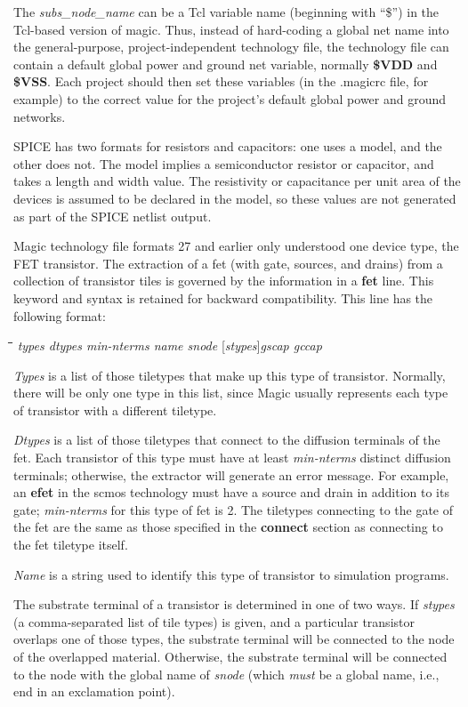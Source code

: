 \documentclass[letterpaper,twoside,12pt]{article}
\def\hinch{\hspace*{0.5in}}
\def\starti{\begin{center}\begin{tabbing}\hinch\=\hinch\=\hinch\=\hinch\=\kill}
\def\endi{\end{tabbing}\end{center}}
\def\ii{\>\>\>}
\begin{document}
The {\itshape subs\_node\_name} can be a Tcl variable name (beginning with ``\$'')
in the Tcl-based version of magic.  Thus, instead of hard-coding a global net
name into the general-purpose, project-independent technology file, the
technology file can contain a default global power and ground net variable,
normally {\bfseries \$VDD} and {\bfseries \$VSS}.  Each project should then
set these variables (in the {\ttfamily .magicrc} file, for example) to the
correct value for the project's default global power and ground networks.

SPICE has two formats for resistors and capacitors:  one uses a model, and
the other does not.  The model implies a semiconductor resistor or
capacitor, and takes a length and width value.  The resistivity or
capacitance per unit area of the devices is assumed to be declared in
the model, so these values are not generated as part of the SPICE
netlist output.

Magic technology file formats 27 and earlier only understood one device
type, the FET transistor.  The extraction of a fet (with gate, sources, and
drains) from a collection of transistor tiles is governed by the
information in a {\bfseries fet} line.  This keyword and syntax is
retained for backward compatibility.  This line has the following
format:

\starti
   \ii {\bfseries fet} {\itshape types dtypes min-nterms name snode }
	[{\itshape stypes}]{\itshape  gscap gccap}
\endi

{\itshape Types} is a list of those tiletypes that
make up this type of transistor.  Normally, there will be only
one type in this list, since Magic usually represents each
type of transistor with a different tiletype.

{\itshape Dtypes} is a list of those tiletypes
that connect to the diffusion terminals of the fet.
Each transistor of this type must have at least {\itshape min-nterms}
distinct diffusion terminals; otherwise, the extractor will
generate an error message.
For example, an {\bfseries efet} in the scmos technology must have
a source and drain in addition to its gate; {\itshape min-nterms}
for this type of fet is 2.
The tiletypes connecting to the gate of the fet are the same
as those specified in the {\bfseries connect} section as connecting
to the fet tiletype itself.

{\itshape Name} is a string used to identify this type of transistor
to simulation programs.

The substrate terminal of a transistor is determined in one
of two ways.
If {\itshape stypes}
(a comma-separated list of tile types) is given, and
a particular transistor overlaps one of those types,
the substrate terminal will be connected to the node
of the overlapped material.
Otherwise, the substrate terminal will be connected
to the node with the global name of {\itshape snode}
(which {\itshape must} be a global name, i.e., end in
an exclamation point).
\end{document}
